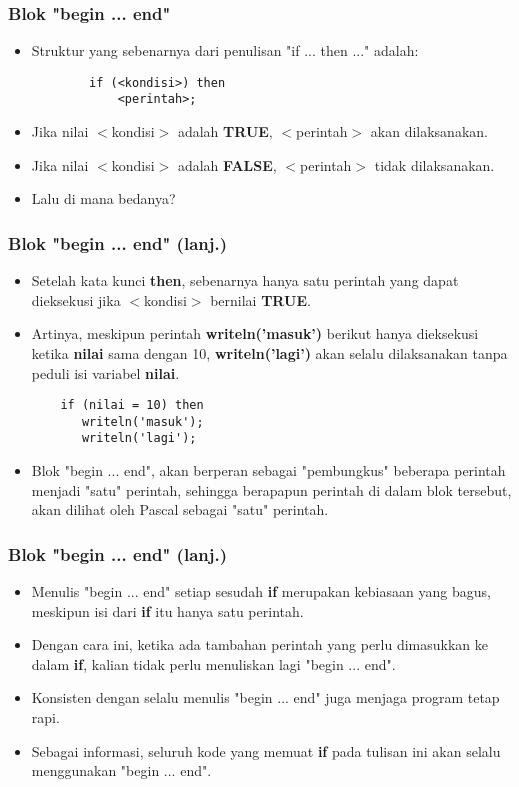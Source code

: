 \documentclass{beamer}
\begin{document}
\begin{frame}[fragile]
\frametitle{Blok "begin ... end"}
\begin{itemize}
	\item Struktur yang sebenarnya dari penulisan "if ... then ..." adalah:
	\begin{lstlisting}
		if (<kondisi>) then
		    <perintah>;
	\end{lstlisting}
	\item Jika nilai $<$kondisi$>$ adalah \textbf{TRUE}, $<$perintah$>$ akan dilaksanakan.
	\item Jika nilai $<$kondisi$>$ adalah \textbf{FALSE}, $<$perintah$>$ tidak dilaksanakan.
	\item Lalu di mana bedanya?
\end{itemize}
\end{frame}

\begin{frame}[fragile]
\frametitle{Blok "begin ... end" (lanj.)}
\begin{itemize}
	\item Setelah kata kunci \textbf{then}, sebenarnya hanya \alert{satu} perintah yang dapat dieksekusi jika $<$kondisi$>$ bernilai \textbf{TRUE}.
	\item Artinya, meskipun perintah \textbf{writeln('masuk')} berikut hanya dieksekusi ketika \textbf{nilai} sama dengan 10, \textbf{writeln('lagi')} akan \alert{selalu dilaksanakan} tanpa peduli isi variabel \textbf{nilai}.
	\begin{lstlisting}
	if (nilai = 10) then
	   writeln('masuk');
	   writeln('lagi');
	\end{lstlisting}
	\item Blok "begin ... end", akan berperan sebagai "pembungkus" beberapa perintah menjadi "satu" perintah, sehingga berapapun perintah di dalam blok tersebut, akan dilihat oleh Pascal sebagai "satu" perintah.
\end{itemize}
\end{frame}

\begin{frame}[fragile]
\frametitle{Blok "begin ... end" (lanj.)}
\begin{itemize}
	\item Menulis "begin ... end" setiap sesudah \textbf{if} merupakan kebiasaan yang bagus, meskipun isi dari \textbf{if} itu hanya satu perintah.
	\item Dengan cara ini, ketika ada tambahan perintah yang perlu dimasukkan ke dalam \textbf{if}, kalian tidak perlu menuliskan lagi "begin ... end".
	\item Konsisten dengan selalu menulis "begin ... end" juga menjaga program tetap rapi.
	\item Sebagai informasi, seluruh kode yang memuat \textbf{if} pada tulisan ini akan selalu menggunakan "begin ... end".
\end{itemize}
\end{frame}
\end{document}
